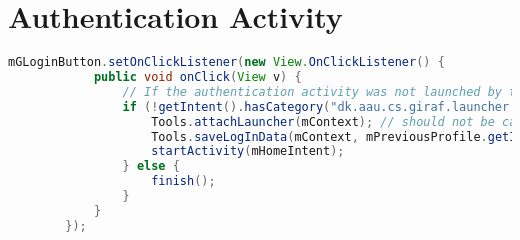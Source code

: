 \section{Authentication Activity}
\begin{lstlisting}[style=sourceCode, language=JAVA, caption=This is code, label=lst:authenticationAcitivity] 
mGLoginButton.setOnClickListener(new View.OnClickListener() {
			public void onClick(View v) {
				// If the authentication activity was not launched by the launcher...
				if (!getIntent().hasCategory("dk.aau.cs.giraf.launcher.GIRAF")) {
					Tools.attachLauncher(mContext); // should not be called
					Tools.saveLogInData(mContext, mPreviousProfile.getId());
					startActivity(mHomeIntent);
				} else {
					finish();
				}
			}
		});
\end{lstlisting}